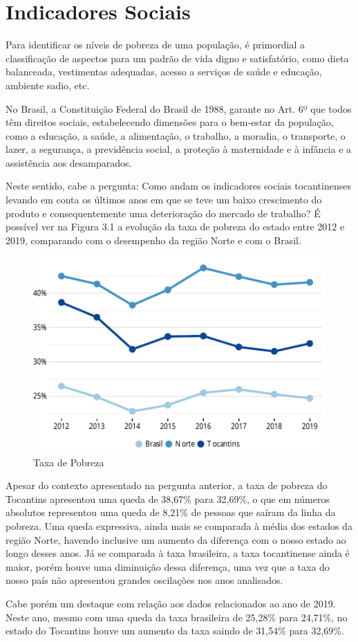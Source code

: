 \chapter{Indicadores Sociais}
\par Para identificar os níveis de pobreza de uma população, é primordial a classificação de aspectos para um padrão de vida digno e satisfatório, como dieta balanceada, vestimentas adequadas, acesso a serviços de saúde e educação, ambiente sadio, etc.
\par No Brasil, a Constituição Federal do Brasil de 1988, garante no Art. 6º que todos têm direitos sociais, estabelecendo dimensões para o bem-estar da população, como a educação, a saúde, a alimentação, o trabalho, a moradia, o transporte, o lazer, a segurança, a previdência social, a proteção à maternidade e à infância e a assistência aos desamparados.
\par Neste sentido, cabe a pergunta: Como andam os indicadores sociais tocantinenses levando em conta os últimos anos em que se teve um baixo crescimento do produto e consequentemente uma deterioração do mercado de trabalho? É possível ver na Figura 3.1 a evolução da taxa de pobreza do estado entre 2012 e 2019, comparando com o desempenho da região Norte e com o Brasil.
\begin{figure}[h]
	\caption{Taxa de Pobreza}
	\includegraphics{fig/taxa_pobreza.pdf}
\end{figure}
\par Apesar do contexto apresentado na pergunta anterior, a taxa de pobreza do Tocantins apresentou uma queda de 38,67\% para 32,69\%, o que em números absolutos representou uma queda de 8,21\% de pessoas que saíram da linha da pobreza. Uma queda expressiva, ainda mais se comparada à média dos estados da região Norte, havendo inclusive um aumento da diferença com o nosso estado ao longo desses anos. Já se comparada à taxa brasileira, a taxa tocantinense ainda é maior, porém houve uma diminuição dessa diferença, uma vez que a taxa do nosso país não apresentou grandes oscilações nos anos analisados.
\par Cabe porém um destaque com relação aos dados relacionados ao ano de 2019. Neste ano, mesmo com uma queda da taxa brasileira de 25,28\% para 24,71\%, no estado do Tocantins houve um aumento da taxa saindo de 31,54\% para 32,69\%.

